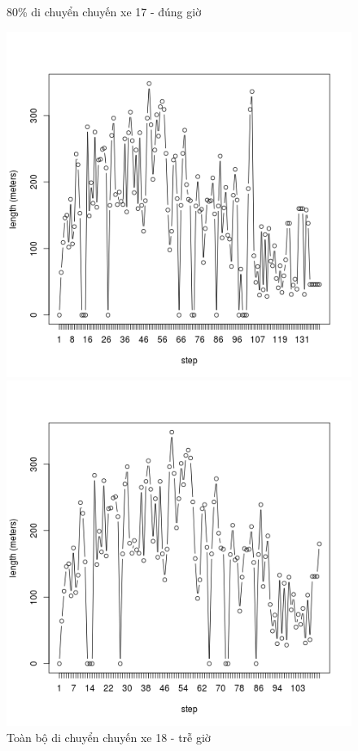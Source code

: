 \documentclass[a4paper, 13pt]{report}
\begin{document}
\begin{figure}[!htb]
  \caption*{80\% di chuyển chuyến xe 17 - đúng giờ}
\endminipage
{}%
  \includegraphics[width=\linewidth]{test_100_18}
  \caption*{Toàn bộ di chuyển chuyến xe 18 - trễ giờ}
\endminipage
{}
  \includegraphics[width=\linewidth]{test_80_18}

\end{figure}
\end{document}
